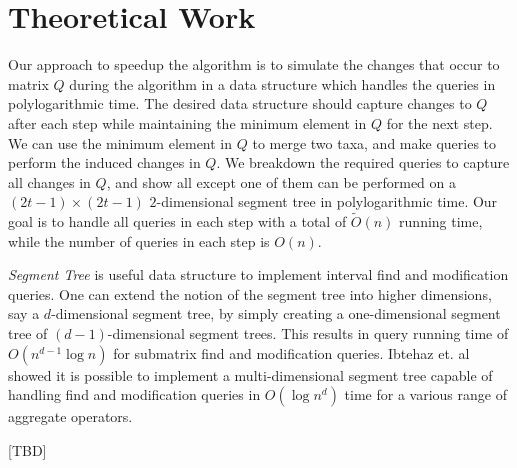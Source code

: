 \section{Theoretical Work}

Our approach to speedup the algorithm is to simulate the changes that occur to matrix $Q$ during the algorithm in a data structure which handles the queries in polylogarithmic time. The desired data structure should capture changes to $Q$ after each step while maintaining the minimum element in $Q$ for the next step. We can use the minimum element in $Q$ to merge two taxa, and make queries to perform the induced changes in $Q$. We breakdown the required queries to capture all changes in $Q$, and show all except one of them can be performed on a $(2t-1) \times (2t-1)$ $2$-dimensional segment tree in polylogarithmic time. Our goal is to handle all queries in each step with a total of $\widetilde{O}(n)$ running time, while the number of queries in each step is $O(n)$.

\emph{Segment Tree} is useful data structure to implement interval find and modification queries. One can extend the notion of the segment tree into higher dimensions, say a $d$-dimensional segment tree, by simply creating a one-dimensional segment tree of $(d-1)$-dimensional segment trees. This results in query running time of $O(n^{d-1}\log{n})$ for submatrix find and modification queries. Ibtehaz et. al~\cite{ibtehaz2018multidimensional} showed it is possible to implement a multi-dimensional segment tree capable of handling find and modification queries in $O(\log{n}^d)$ time for a various range of aggregate operators.

[TBD]